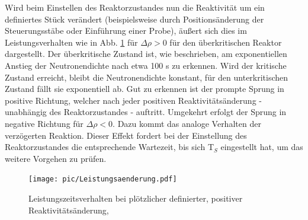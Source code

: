 	Wird beim Einstellen des Reaktorzustandes nun die Reaktivität um ein definiertes Stück verändert (beispielsweise durch Positionsänderung der Steuerungsstäbe oder Einführung einer Probe), äußert sich dies im Leistungsverhalten wie in Abb. \ref{fig: leistungsverhalten} für $\Delta \rho >0$ für den überkritischen Reaktor dargestellt. Der überkritische Zustand ist, wie beschrieben, am exponentiellen Anstieg der Neutronendichte nach etwa 100 s zu erkennen. Wird der kritische Zustand erreicht, bleibt die Neutronendichte konstant, für den unterkritischen Zustand fällt sie exponentiell ab. Gut zu erkennen ist der prompte Sprung in positive Richtung, welcher nach jeder positiven Reaktivitätsänderung - unabhängig des Reaktorzustandes - auftritt. Umgekehrt erfolgt der Sprung in negative Richtung für $\Delta \rho <0$. Dazu kommt das analoge Verhalten der verzögerten Reaktion. Dieser Effekt fordert bei der Einstellung des Reaktorzustandes die entsprechende Wartezeit, bis sich T$_{S}$ eingestellt hat, um das weitere Vorgehen zu prüfen.
	
	\begin{figure}[ht]
	\centering
	\texttt{[image: pic/Leistungsaenderung.pdf]}
	\caption{Leistungszeitsverhalten bei plötzlicher definierter, positiver Reaktivitätsänderung, \cite{start}}
	\label{fig: leistungsverhalten}
	\end{figure}
	

